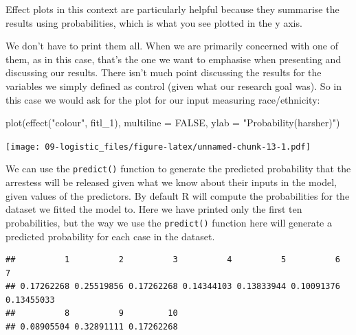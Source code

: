 \documentclass[
]{book}
\newenvironment{Shaded}{\begin{snugshade}}{\end{snugshade}}
\newcommand{\AttributeTok}[1]{\textcolor[rgb]{0.77,0.63,0.00}{#1}}
\newcommand{\CommentTok}[1]{\textcolor[rgb]{0.56,0.35,0.01}{\textit{#1}}}
\newcommand{\ConstantTok}[1]{\textcolor[rgb]{0.00,0.00,0.00}{#1}}
\newcommand{\DecValTok}[1]{\textcolor[rgb]{0.00,0.00,0.81}{#1}}
\newcommand{\FunctionTok}[1]{\textcolor[rgb]{0.00,0.00,0.00}{#1}}
\newcommand{\NormalTok}[1]{#1}
\newcommand{\OtherTok}[1]{\textcolor[rgb]{0.56,0.35,0.01}{#1}}
\newcommand{\SpecialCharTok}[1]{\textcolor[rgb]{0.00,0.00,0.00}{#1}}
\newcommand{\StringTok}[1]{\textcolor[rgb]{0.31,0.60,0.02}{#1}}
\begin{document}
Effect plots in this context are particularly helpful because they summarise the results using probabilities, which is what you see plotted in the y axis.

We don't have to print them all. When we are primarily concerned with one of them, as in this case, that's the one we want to emphasise when presenting and discussing our results. There isn't much point discussing the results for the variables we simply defined as control (given what our research goal was). So in this case we would ask for the plot for our input measuring race/ethnicity:

\begin{Shaded}
\begin{Highlighting}[]
\FunctionTok{plot}\NormalTok{(}\FunctionTok{effect}\NormalTok{(}\StringTok{"colour"}\NormalTok{, fitl\_1), }\AttributeTok{multiline =} \ConstantTok{FALSE}\NormalTok{, }\AttributeTok{ylab =} \StringTok{"Probability(harsher)"}\NormalTok{)}
\end{Highlighting}
\end{Shaded}

\texttt{[image: 09-logistic\_files/figure-latex/unnamed-chunk-13-1.pdf]}

We can use the \texttt{predict()} function to generate the predicted probability that the arrestess will be released given what we know about their inputs in the model, given values of the predictors. By default R will compute the probabilities for the dataset we fitted the model to. Here we have printed only the first ten probabilities, but the way we use the \texttt{predict()} function here will generate a predicted probability for each case in the dataset.

\begin{Shaded}
\end{Shaded}

\begin{verbatim}
##          1          2          3          4          5          6          7 
## 0.17262268 0.25519856 0.17262268 0.14344103 0.13833944 0.10091376 0.13455033 
##          8          9         10 
## 0.08905504 0.32891111 0.17262268
\end{verbatim}
\end{document}
